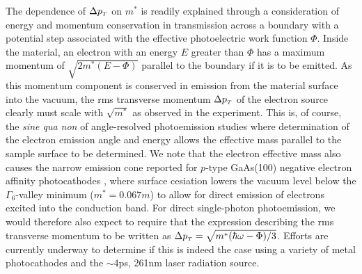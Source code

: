 The dependence of $\Delta p_{{\scriptscriptstyle T}}$ on $m^*$ is readily explained through a consideration of energy and momentum conservation in transmission across a boundary with a potential step associated with the effective photoelectric work function $\Phi$.
Inside the material, an electron with an energy $E$ greater than $\Phi$ has a maximum momentum of $\sqrt{2 m^* (E-\Phi) }$ parallel to the boundary if it is to be emitted.
As this momentum component is conserved in emission from the material surface into the vacuum, the rms transverse momentum $\Delta p_{{\scriptscriptstyle T}}$ of the electron source clearly must scale with $\sqrt{m^*}$ as observed in the experiment.
This is, of course, the \textit{sine qua non} of angle-resolved photoemission studies \cite{himpsel_angle-resolved_1983} where determination of the electron emission angle and energy allows the effective mass parallel to the sample surface to be determined.
We note that the electron effective mass also causes the narrow emission cone reported for $p$-type GaAs(100) negative electron affinity photocathodes \cite{liu_narrow_2005}, where surface cesiation lowers the vacuum level below the $\Gamma_6$-valley minimum ($m^* = 0.067m$)  to allow for direct emission of electrons excited into the conduction band.
For direct single-photon photoemission, we would therefore also expect to require that the expression describing the rms transverse momentum to be written as $\Delta p_{{\scriptscriptstyle T}} = \sqrt{m^* ( \hbar \omega - \Phi ) / 3 }$.
Efforts are currently underway to determine if this is indeed the case using a variety of metal photocathodes and the $\sim$4ps, 261nm laser radiation source. 
